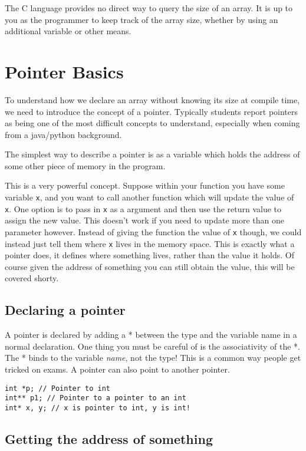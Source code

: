 The C language provides no direct way to query the size of an array.
It is up to you as the programmer to keep track of the array size, whether by using an additional variable or other means.

\section{Pointer Basics}

To understand how we declare an array without knowing its size at compile time, we need to introduce the concept of a pointer.
Typically students report pointers as being one of the most difficult concepts to understand, especially when coming from a java/python background.

The simplest way to describe a pointer is as a variable which holds the address of some other piece of memory in the program.

This is a very powerful concept.
Suppose within your function you have some variable \texttt{x}, and you want to call another function which will update the value of \texttt{x}.
One option is to pass in \texttt{x} as a argument and then use the return value to assign the new value.
This doesn't work if you need to update more than one parameter however.
Instead of giving the function the value of \texttt{x} though, we could instead just tell them where \texttt{x} lives in the memory space.
This is exactly what a pointer does, it defines where something lives, rather than the value it holds. 
Of course given the address of something you can still obtain the value, this will be covered shorty.

\subsection{Declaring a pointer}

A pointer is declared by adding a * between the type and the variable name in a normal declaration.
One thing you must be careful of is the associativity of the *.
The * binds to the variable \emph{name}, not the type!
This is a common way people get tricked on exams.
A pointer can also point to another pointer.

\begin{lstlisting}
int *p; // Pointer to int
int** p1; // Pointer to a pointer to an int
int* x, y; // x is pointer to int, y is int!
\end{lstlisting}

\subsection{Getting the address of something}

